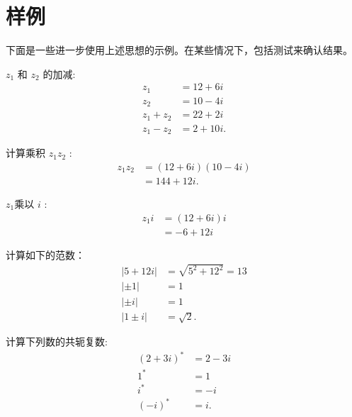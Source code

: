 \section{样例}
下面是一些进一步使用上述思想的示例。在某些情况下，包括测试来确认结果。


\begin{example}
    $z_{1}$ 和 $z_{2}$ 的加减:
    $$
    \begin{aligned}
    z_{1} & =12+6 i \\
    z_{2} & =10-4 i \\
    z_{1}+z_{2} & =22+2 i \\
    z_{1}-z_{2} & =2+10 i .
    \end{aligned}
    $$
\end{example}

\begin{example}
    计算乘积 $z_{1} z_{2}$ :
    $$
    \begin{aligned}
    z_{1} z_{2} & =(12+6 i)(10-4 i) \\
    & =144+12 i .
    \end{aligned}
    $$
\end{example}

\begin{example}
    $z_{1}$乘以 $i$ :
    $$
    \begin{aligned}
    z_{1} i & =(12+6 i) i \\
    & =-6+12 i
    \end{aligned}
    $$
\end{example}

\begin{example}
    计算如下的范数：
    $$
    \begin{aligned}
    |5+12 i| & =\sqrt{5^{2}+12^{2}}=13 \\
    |\pm 1| & =1 \\
    |\pm i| & =1 \\
    |1 \pm i| & =\sqrt{2} .
    \end{aligned}
    $$
\end{example}

\begin{example}
    计算下列数的共轭复数:
    $$
    \begin{aligned}
    (2+3 i)^{*} & =2-3 i \\
    1^{*} & =1 \\
    i^{*} & =-i \\
    (-i)^{*} & =i .
    \end{aligned}
    $$
\end{example}

